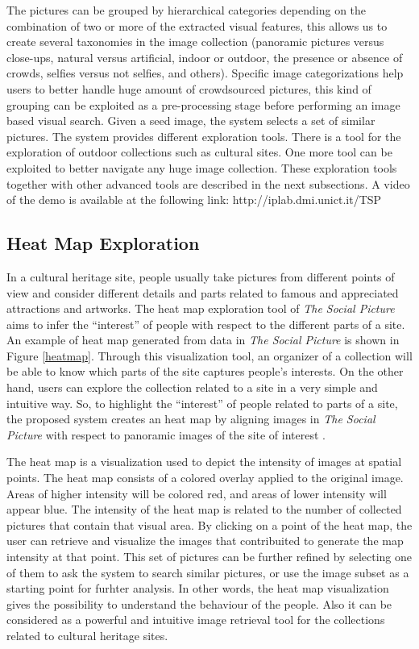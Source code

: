 The pictures can be grouped by hierarchical categories depending on the combination of two or more of the extracted visual features, this allows us to create several taxonomies in the image collection (panoramic pictures versus close-ups, natural versus artificial, indoor or outdoor, the presence or absence of crowds, selfies versus not selfies, and others).
Specific image categorizations help users to better handle huge amount of crowdsourced pictures, this kind of grouping can be exploited as a pre-processing stage before performing an image based visual search. Given a seed image, the system selects a set of similar pictures.
The system provides different exploration tools. There is a tool for the exploration of outdoor collections such as cultural sites. %
One more tool can be exploited to better navigate any huge image collection. These exploration tools together with other advanced tools are described in the next subsections.
A video of the demo is available at the following link:
http://iplab.dmi.unict.it/TSP

\subsection{Heat Map Exploration}
In a cultural heritage site, people usually take pictures from different points of view and consider different details and parts related to famous and appreciated attractions and artworks. The heat map exploration tool of \textit{The Social Picture} aims to infer the ``interest'' of people with respect to the different parts of a site. An example of heat map generated from data in \textit{The Social Picture} is shown in Figure \ref{heatmap}. Through this visualization tool, an organizer of a collection will be able to know which parts of the site captures people's interests.
On the other hand, users can explore the collection related to a site in a very simple and intuitive way. So, to highlight the ``interest'' of people related to parts of a site, the proposed system creates an heat map by aligning images in \textit{The Social Picture} with respect to panoramic images of the site of interest \cite{Mikulík2015}.

The heat map is a visualization used to depict the intensity of images at spatial points. The heat map consists of a colored overlay applied to the original image. Areas of higher intensity will be colored red, and areas of lower intensity will appear blue. The intensity of the heat map is related to the number of collected pictures that contain that visual area.
By clicking on a point of the heat map, the user can retrieve and visualize the images that contribuited to generate the map intensity at that point. This set of pictures can be further refined by selecting one of them to ask the system to search similar pictures, or use the image subset as a starting point for furhter analysis. In other words, the heat map visualization gives the possibility to understand the behaviour of the people. Also it can be considered as a powerful and intuitive image retrieval tool for the collections related to cultural heritage sites.


